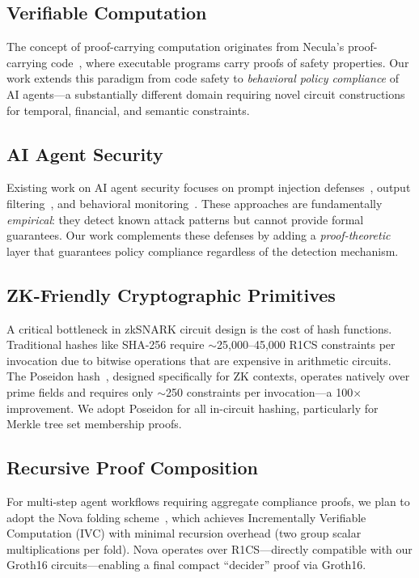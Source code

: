 \documentclass[conference]{IEEEtran}
\begin{document}
\subsection{Verifiable Computation}

The concept of proof-carrying computation originates from Necula's proof-carrying code~\cite{necula1997}, where executable programs carry proofs of safety properties. Our work extends this paradigm from code safety to \textit{behavioral policy compliance} of AI agents---a substantially different domain requiring novel circuit constructions for temporal, financial, and semantic constraints.

\subsection{AI Agent Security}

Existing work on AI agent security focuses on prompt injection defenses~\cite{perez2022}, output filtering~\cite{rebedea2023}, and behavioral monitoring~\cite{shavit2023}. These approaches are fundamentally \textit{empirical}: they detect known attack patterns but cannot provide formal guarantees. Our work complements these defenses by adding a \textit{proof-theoretic} layer that guarantees policy compliance regardless of the detection mechanism.

\subsection{ZK-Friendly Cryptographic Primitives}

A critical bottleneck in zkSNARK circuit design is the cost of hash functions. Traditional hashes like SHA-256 require $\sim$25,000--45,000 R1CS constraints per invocation due to bitwise operations that are expensive in arithmetic circuits. The Poseidon hash~\cite{poseidon2021}, designed specifically for ZK contexts, operates natively over prime fields and requires only $\sim$250 constraints per invocation---a 100$\times$ improvement. We adopt Poseidon for all in-circuit hashing, particularly for Merkle tree set membership proofs.

\subsection{Recursive Proof Composition}

For multi-step agent workflows requiring aggregate compliance proofs, we plan to adopt the Nova folding scheme~\cite{nova2022}, which achieves Incrementally Verifiable Computation (IVC) with minimal recursion overhead (two group scalar multiplications per fold). Nova operates over R1CS---directly compatible with our Groth16 circuits---enabling a final compact ``decider'' proof via Groth16.
\end{document}
